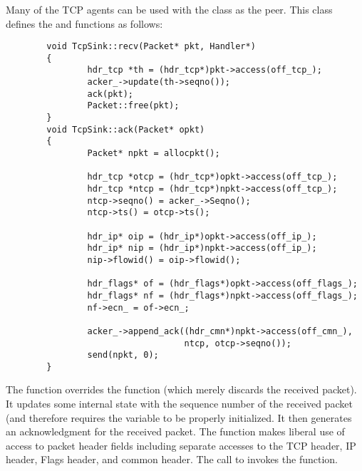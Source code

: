 \subsubsection{}

Many of the TCP agents can be used with the  class
as the peer.
This class defines the  and  functions as follows:
\begin{small}
\begin{verbatim}
        void TcpSink::recv(Packet* pkt, Handler*)
        {
                hdr_tcp *th = (hdr_tcp*)pkt->access(off_tcp_);
                acker_->update(th->seqno());
                ack(pkt);
                Packet::free(pkt);
        }
        void TcpSink::ack(Packet* opkt)
        {
                Packet* npkt = allocpkt();
        
                hdr_tcp *otcp = (hdr_tcp*)opkt->access(off_tcp_);
                hdr_tcp *ntcp = (hdr_tcp*)npkt->access(off_tcp_);
                ntcp->seqno() = acker_->Seqno();
                ntcp->ts() = otcp->ts();
        
                hdr_ip* oip = (hdr_ip*)opkt->access(off_ip_);
                hdr_ip* nip = (hdr_ip*)npkt->access(off_ip_);
                nip->flowid() = oip->flowid();
        
                hdr_flags* of = (hdr_flags*)opkt->access(off_flags_);
                hdr_flags* nf = (hdr_flags*)npkt->access(off_flags_);
                nf->ecn_ = of->ecn_;
        
                acker_->append_ack((hdr_cmn*)npkt->access(off_cmn_),
                                   ntcp, otcp->seqno());
                send(npkt, 0);
        }
\end{verbatim}
\end{small}
The  function overrides the  function
(which merely discards the received packet).
It updates some internal state with the sequence number of the
received packet (and therefore requires the  variable
to be properly initialized.
It then generates an acknowledgment for the received packet.
The  function makes liberal use of access to packet header
fields including separate accesses to the TCP header, IP header,
Flags header, and common header.
The call to  invokes the  function.

\subsubsection{}

